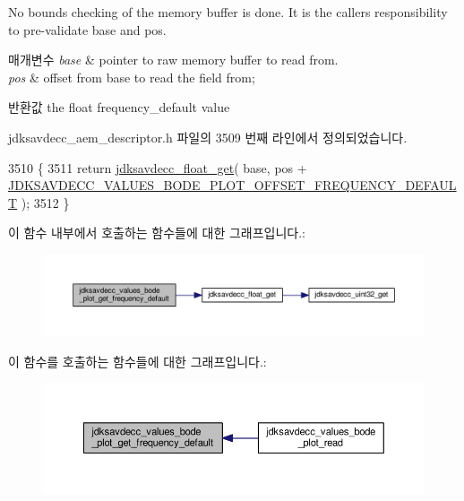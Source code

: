 No bounds checking of the memory buffer is done. It is the caller\textquotesingle{}s responsibility to pre-\/validate base and pos.


\begin{DoxyParams}{매개변수}
{\em base} & pointer to raw memory buffer to read from. \\
\hline
{\em pos} & offset from base to read the field from; \\
\hline
\end{DoxyParams}
\begin{DoxyReturn}{반환값}
the float frequency\+\_\+default value 
\end{DoxyReturn}


jdksavdecc\+\_\+aem\+\_\+descriptor.\+h 파일의 3509 번째 라인에서 정의되었습니다.


\begin{DoxyCode}
3510 \{
3511     \textcolor{keywordflow}{return} \hyperlink{group__endian_gadf6108d4d5f2936dd5018e4b80265c8c}{jdksavdecc\_float\_get}( base, pos + 
      \hyperlink{group__values__bode__plot_ga77bb61b01cddd727c68d2352ac3aa9a7}{JDKSAVDECC\_VALUES\_BODE\_PLOT\_OFFSET\_FREQUENCY\_DEFAULT} );
3512 \}
\end{DoxyCode}


이 함수 내부에서 호출하는 함수들에 대한 그래프입니다.\+:
\nopagebreak
\begin{figure}[H]
\begin{center}
\leavevmode
\includegraphics[width=350pt]{group__values__bode__plot_gac302033b82efb10723968fff4af183f9_cgraph}
\end{center}
\end{figure}




이 함수를 호출하는 함수들에 대한 그래프입니다.\+:
\nopagebreak
\begin{figure}[H]
\begin{center}
\leavevmode
\includegraphics[width=350pt]{group__values__bode__plot_gac302033b82efb10723968fff4af183f9_icgraph}
\end{center}
\end{figure}


